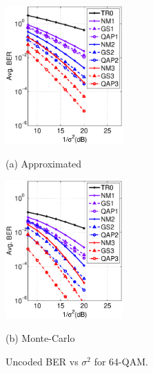 \documentclass{article}
\begin{document}
\begin{figure}[htb]

  \begin{minipage}[b]{.48\linewidth}
    \centering
    \centerline{\includegraphics[width=4.5cm]{./figs/BER_noise_power_approx_64QAM.eps}}
    \centerline{(a) Approximated}\medskip
  \end{minipage}
  \hfill
  \begin{minipage}[b]{0.48\linewidth}
    \centering
    \centerline{\includegraphics[width=4.5cm]{./figs/BER_noise_power_MonteCarlo_64QAM.eps}}
    \centerline{(b) Monte-Carlo}\medskip
  \end{minipage}
  \caption{Uncoded BER vs $\sigma^2$ for 64-QAM.}
  \label{fig:uncoded_noisepower}
%
\end{figure}
 
\end{document}
